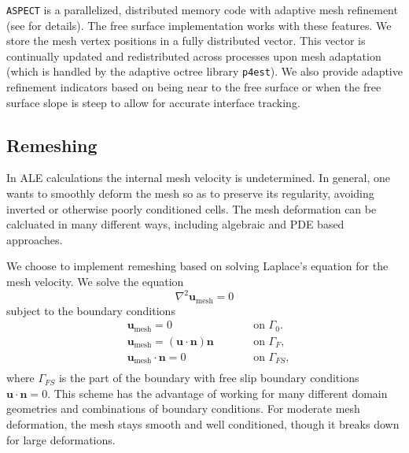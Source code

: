 \documentclass[preprint,12pt,authoryear]{elsarticle}
\begin{document}
\texttt{ASPECT} is a parallelized, distributed memory code with adaptive mesh refinement (see \cite{BBHK10} for details).
The free surface implementation works with these features.  We store the mesh vertex positions 
in a fully distributed vector. This vector is continually updated and redistributed across 
processes upon mesh adaptation (which is handled by the adaptive octree library \texttt{p4est}).
We also provide adaptive refinement indicators based on being near to the free surface or 
when the free surface slope is steep to allow for accurate interface tracking.


\subsection{Remeshing}
\label{sec:remeshing}

In ALE calculations the internal mesh velocity is undetermined.
In general, one wants to smoothly deform the mesh so as to preserve its regularity, 
avoiding inverted or otherwise poorly conditioned cells.
The mesh deformation can be calcluated in many different ways, including algebraic \citep[e.g.][]{thieulot2011fantom} 
and PDE based approaches.

We choose to implement remeshing based on solving Laplace's equation for the mesh velocity.
We solve the equation
\begin{equation}
\nabla^2 \mathbf{u}_{\mathrm{mesh}} = 0
\label{eq:laplacian_smoothing}
\end{equation}
subject to the boundary conditions
\begin{equation}
\begin{aligned}
&\mathbf{u}_\mathrm{mesh} = 0 & \qquad & \textrm{on } \Gamma_0. \\
&\mathbf{u}_\mathrm{mesh} = \left( \textbf{u} \cdot \textbf{n} \right) \textbf{n} & \qquad & \textrm{on } \Gamma_F, \\
&\mathbf{u}_\mathrm{mesh} \cdot \textbf{n} = 0 & \qquad & \textrm{on } \Gamma_{FS}, \\
\end{aligned}
\label{eq:laplacian_bcs}
\end{equation}
where $\Gamma_{FS}$ is the part of the boundary with free slip boundary conditions $\mathbf{u \cdot n} = 0$.
This scheme has the advantage of working for many different domain geometries and combinations of boundary conditions.
For moderate mesh deformation, the mesh stays smooth and well conditioned, though it breaks down for large deformations.
\end{document}

